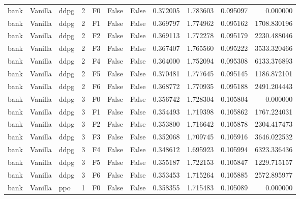 \begin{tabular}{lllrlllrrrr}
      bank & Vanilla &      ddpg &     2 &  F0 &           False &            False &  0.372005 &  1.783603 & 0.095097 &         0.000000 \\
      bank & Vanilla &      ddpg &     2 &  F1 &           False &            False &  0.369797 &  1.774962 & 0.095162 &      1708.830196 \\
      bank & Vanilla &      ddpg &     2 &  F2 &           False &            False &  0.369113 &  1.772278 & 0.095179 &      2230.488046 \\
      bank & Vanilla &      ddpg &     2 &  F3 &           False &            False &  0.367407 &  1.765560 & 0.095222 &      3533.320466 \\
      bank & Vanilla &      ddpg &     2 &  F4 &           False &            False &  0.364000 &  1.752094 & 0.095308 &      6133.376893 \\
      bank & Vanilla &      ddpg &     2 &  F5 &           False &            False &  0.370481 &  1.777645 & 0.095145 &      1186.872101 \\
      bank & Vanilla &      ddpg &     2 &  F6 &           False &            False &  0.368772 &  1.770935 & 0.095188 &      2491.204443 \\
      bank & Vanilla &      ddpg &     3 &  F0 &           False &            False &  0.356742 &  1.728304 & 0.105804 &         0.000000 \\
      bank & Vanilla &      ddpg &     3 &  F1 &           False &            False &  0.354493 &  1.719398 & 0.105862 &      1767.224031 \\
      bank & Vanilla &      ddpg &     3 &  F2 &           False &            False &  0.353800 &  1.716642 & 0.105878 &      2304.417473 \\
      bank & Vanilla &      ddpg &     3 &  F3 &           False &            False &  0.352068 &  1.709745 & 0.105916 &      3646.022532 \\
      bank & Vanilla &      ddpg &     3 &  F4 &           False &            False &  0.348612 &  1.695923 & 0.105994 &      6323.336436 \\
      bank & Vanilla &      ddpg &     3 &  F5 &           False &            False &  0.355187 &  1.722153 & 0.105847 &      1229.715157 \\
      bank & Vanilla &      ddpg &     3 &  F6 &           False &            False &  0.353453 &  1.715264 & 0.105885 &      2572.895977 \\
      bank & Vanilla &       ppo &     1 &  F0 &           False &            False &  0.358355 &  1.715483 & 0.105089 &         0.000000 \\

\end{tabular}
